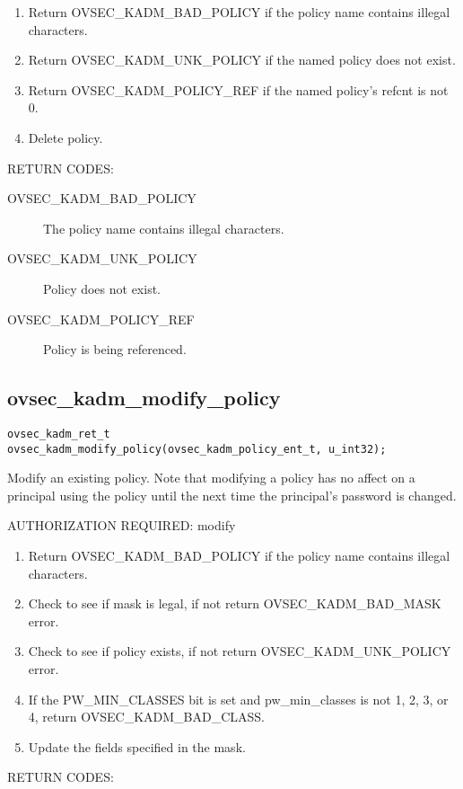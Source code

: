 \begin{enumerate}
\item Return OVSEC_KADM_BAD_POLICY if the policy name contains illegal
characters.
\item Return OVSEC_KADM_UNK_POLICY if the named policy does not exist.
\item Return OVSEC_KADM_POLICY_REF if the named policy's refcnt is not 0.
\item Delete policy.
\end{enumerate}

RETURN CODES:

\begin{description}
\item[OVSEC_KADM_BAD_POLICY] The policy name contains illegal characters.
\item[OVSEC_KADM_UNK_POLICY] Policy does not exist.
\item[OVSEC_KADM_POLICY_REF] Policy is being referenced. 
\end{description}

\subsection{ovsec_kadm_modify_policy}

\begin{verbatim}
ovsec_kadm_ret_t
ovsec_kadm_modify_policy(ovsec_kadm_policy_ent_t, u_int32);
\end{verbatim}

Modify an existing policy.  Note that modifying a policy has no affect
on a principal using the policy until the next time the principal's
password is changed.

AUTHORIZATION REQUIRED: modify

\begin{enumerate}
\item Return OVSEC_KADM_BAD_POLICY if the policy name contains illegal
characters.
\item Check to see if mask is legal, if not return OVSEC_KADM_BAD_MASK error.
\item Check to see if policy exists, if not return
OVSEC_KADM_UNK_POLICY error.
\item If the PW_MIN_CLASSES bit is set and pw_min_classes is not 1, 2,
3, or 4, return OVSEC_KADM_BAD_CLASS.
\item Update the fields specified in the mask.
\end{enumerate}

RETURN CODES: 

